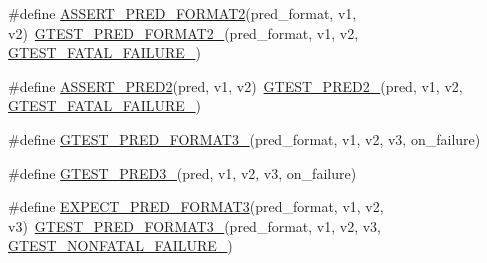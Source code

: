 \begin{DoxyCompactItemize}
\#define \mbox{\hyperlink{googletest-master_2googletest_2include_2gtest_2gtest__pred__impl_8h_ac452685a1a98ea3d96eb956a062ee210}{A\+S\+S\+E\+R\+T\+\_\+\+P\+R\+E\+D\+\_\+\+F\+O\+R\+M\+A\+T2}}(pred\+\_\+format,  v1,  v2)~\mbox{\hyperlink{_obj__test_2lib_2googletest-release-1_88_81_2googletest_2include_2gtest_2gtest__pred__impl_8h_a115c18d1f752b7f091d577fb69cac372}{G\+T\+E\+S\+T\+\_\+\+P\+R\+E\+D\+\_\+\+F\+O\+R\+M\+A\+T2\+\_\+}}(pred\+\_\+format, v1, v2, \mbox{\hyperlink{_obj__test_2lib_2googletest-release-1_88_81_2googletest_2include_2gtest_2internal_2gtest-internal_8h_a0f9a4c3ea82cc7bf4478eaffdc168358}{G\+T\+E\+S\+T\+\_\+\+F\+A\+T\+A\+L\+\_\+\+F\+A\+I\+L\+U\+R\+E\+\_\+}})
\item 
\#define \mbox{\hyperlink{googletest-master_2googletest_2include_2gtest_2gtest__pred__impl_8h_a4e9b777cce4e5423f4c2e491be7aa818}{A\+S\+S\+E\+R\+T\+\_\+\+P\+R\+E\+D2}}(pred,  v1,  v2)~\mbox{\hyperlink{_obj__test_2lib_2googletest-release-1_88_81_2googletest_2include_2gtest_2gtest__pred__impl_8h_ac560264104bd030b64034505d294a7b6}{G\+T\+E\+S\+T\+\_\+\+P\+R\+E\+D2\+\_\+}}(pred, v1, v2, \mbox{\hyperlink{_obj__test_2lib_2googletest-release-1_88_81_2googletest_2include_2gtest_2internal_2gtest-internal_8h_a0f9a4c3ea82cc7bf4478eaffdc168358}{G\+T\+E\+S\+T\+\_\+\+F\+A\+T\+A\+L\+\_\+\+F\+A\+I\+L\+U\+R\+E\+\_\+}})
\item 
\#define \mbox{\hyperlink{googletest-master_2googletest_2include_2gtest_2gtest__pred__impl_8h_a49cdf8707268ee932bb772d879a226cc}{G\+T\+E\+S\+T\+\_\+\+P\+R\+E\+D\+\_\+\+F\+O\+R\+M\+A\+T3\+\_\+}}(pred\+\_\+format,  v1,  v2,  v3,  on\+\_\+failure)
\item 
\#define \mbox{\hyperlink{googletest-master_2googletest_2include_2gtest_2gtest__pred__impl_8h_af30518f03233bc4486b55284b0827eb8}{G\+T\+E\+S\+T\+\_\+\+P\+R\+E\+D3\+\_\+}}(pred,  v1,  v2,  v3,  on\+\_\+failure)
\item 
\#define \mbox{\hyperlink{googletest-master_2googletest_2include_2gtest_2gtest__pred__impl_8h_a7285708fa5d37d6d8ed5b5e59da08bae}{E\+X\+P\+E\+C\+T\+\_\+\+P\+R\+E\+D\+\_\+\+F\+O\+R\+M\+A\+T3}}(pred\+\_\+format,  v1,  v2,  v3)~\mbox{\hyperlink{_obj__test_2lib_2googletest-release-1_88_81_2googletest_2include_2gtest_2gtest__pred__impl_8h_a49cdf8707268ee932bb772d879a226cc}{G\+T\+E\+S\+T\+\_\+\+P\+R\+E\+D\+\_\+\+F\+O\+R\+M\+A\+T3\+\_\+}}(pred\+\_\+format, v1, v2, v3, \mbox{\hyperlink{_obj__test_2lib_2googletest-release-1_88_81_2googletest_2include_2gtest_2internal_2gtest-internal_8h_a6cb7482cfa03661a91c698eb5895f642}{G\+T\+E\+S\+T\+\_\+\+N\+O\+N\+F\+A\+T\+A\+L\+\_\+\+F\+A\+I\+L\+U\+R\+E\+\_\+}})

\end{DoxyCompactItemize}
